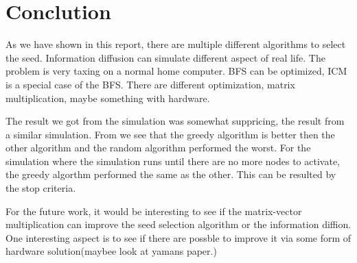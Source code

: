 \chapter{Conclution}
As we have shown in this report, there are multiple different algorithms to select the seed. Information diffusion can simulate different aspect of real life. The problem is very taxing on a normal home computer. BFS can be optimized, ICM is a special case of the BFS. There are different optimization, matrix multiplication, maybe something with hardware. 

The result we got from the simulation was somewhat suppricing, the result from a similar simulation\cite{MaximizedSpread2003}. From \cite{MaximizedSpread2003} we see that the greedy algorithm is better then the other algorithm and the random algorithm performed the worst. For the simulation where the simulation runs until there are no more nodes to activate, the greedy algorthm performed the same as the other. This can be resulted by the stop criteria.

For the future work, it would be interesting to see if the matrix-vector multiplication can improve the seed selection algorithm or the information diffion. One interesting aspect is to see if there are possble to improve it via some form of hardware solution(maybee look at yamans paper.)

